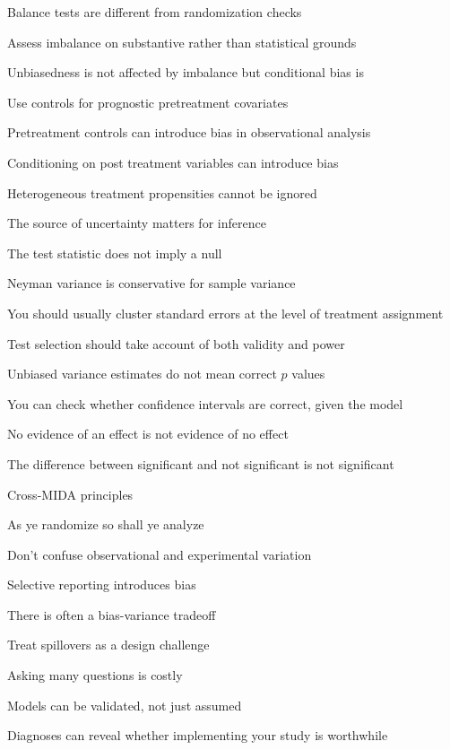 \documentclass[11pt]{article}
\begin{document}
\begin{legal}
\begin{legal}
    \begin{legal}
		\item 	Balance tests are different from randomization checks 
		\item   Assess imbalance on substantive rather than statistical grounds
		\item 	Unbiasedness is not affected by imbalance but conditional bias is
		\item 	Use controls for prognostic pretreatment covariates
		\item 	Pretreatment controls can introduce bias in observational analysis
		\item 	Conditioning on post treatment variables can introduce bias
		\item 	Heterogeneous treatment propensities cannot be ignored
		\item 	The source of uncertainty matters for inference
		\item 	The test statistic does not imply a null
		\item 	Neyman variance is conservative for sample variance
		\item 	You should usually cluster standard errors at the level of treatment assignment
		\item	Test selection should take account of both validity and power 
		\item	Unbiased variance estimates do not mean correct $p$ values
		\item	You can check whether confidence intervals are correct, given the model 
		\item	No evidence of an effect is not evidence of no effect
		\item	The difference between significant and not significant is not significant
		\end{legal}
		
		\item Cross-MIDA principles
		
		\begin{legal}
		\item	As ye randomize so shall ye analyze
		\item	Don't confuse observational and experimental variation
		\item	Selective reporting introduces bias
		\item	There is often a bias-variance tradeoff
		\item	Treat spillovers as a design challenge
		\item	Asking many questions is costly			
		\item	Models can be validated, not just assumed
		\item Diagnoses can reveal whether implementing your study is worthwhile
		\end{legal}
	\end{legal}
	

\end{legal}
\end{document}
